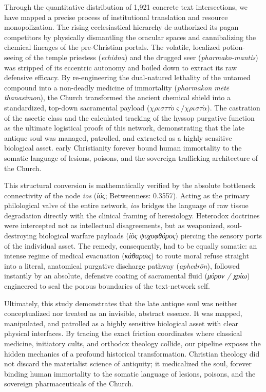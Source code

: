 \documentclass[11pt,twoside,a4paper]{article}
\begin{document}
Through the quantitative distribution of 1,921 concrete text intersections, we have mapped a precise process of institutional translation and resource monopolization. The rising ecclesiastical hierarchy de-authorized its pagan competitors by physically dismantling the oracular spaces and cannibalizing the chemical lineages of the pre-Christian portals. The volatile, localized potion-seeing of the temple priestess (\textit{echidna}) and the drugged seer (\textit{pharmako-mantis}) was stripped of its eccentric autonomy and boiled down to extract its raw defensive efficacy. By re-engineering the dual-natured lethality of the untamed compound into a non-deadly medicine of immortality (\textit{pharmakon m\={e}t\={e} thanasimon}), the Church transformed the ancient chemical shield into a standardized, top-down sacramental payload ($\chi\rho\iota\sigma\tau\tau\acute{o}\varsigma/\chi\rho\iota\sigma\tau\acute{\alpha}$). The castration of the ascetic class and the calculated tracking of the hyssop purgative function as the ultimate logistical proofs of this network, demonstrating that the late antique soul was managed, patrolled, and extracted as a highly sensitive biological asset. early Christianity forever bound human immortality to the somatic language of lesions, poisons, and the sovereign trafficking architecture of the Church.

This structural conversion is mathematically verified by the absolute bottleneck connectivity of the node \textit{ios} (\textit{ἰός}; Betweenness: 0.3557). Acting as the primary philological valve of the entire network, \textit{ios} bridges the language of raw tissue degradation directly with the clinical framing of heresiology. Heterodox doctrines were intercepted not as intellectual disagreements, but as weaponized, soul-destroying biological warfare payloads (\textit{ἰὸς ψυχοφθόρος}) piercing the sensory ports of the individual asset. The remedy, consequently, had to be equally somatic: an intense regime of medical evacuation (\textit{κάθαρσις}) to route moral refuse straight into a literal, anatomical purgative discharge pathway (\textit{aphedr\={o}n}), followed instantly by an absolute, defensive coating of sacramental fluid (\textit{μύρον / χρίω}) engineered to seal the porous boundaries of the text-network self. 

Ultimately, this study demonstrates that the late antique soul was neither conceptualized nor treated as an invisible, abstract essence. It was mapped, manipulated, and patrolled as a highly sensitive biological asset with clear physical interfaces. By tracing the exact friction coordinates where classical medicine, initiatory cults, and orthodox theology collide, our pipeline exposes the hidden mechanics of a profound historical transformation. Christian theology did not discard the materialist science of antiquity; it medicalized the soul, forever binding human immortality to the somatic language of lesions, poisons, and the sovereign pharmaceuticals of the Church.
\end{document}
